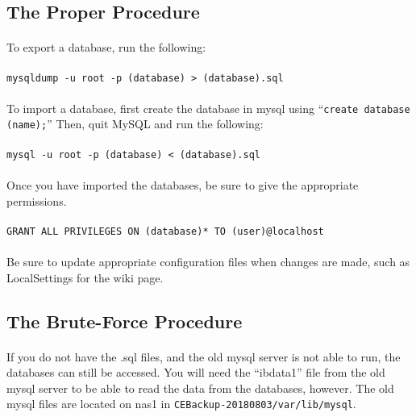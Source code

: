 \documentclass[12pt]{article}
\begin{document}
\subsection{The Proper Procedure}
\paragraph{} To export a database, run the following:
\paragraph{}{\tt mysqldump -u root -p (database) > (database).sql}
\paragraph{} To import a database, first create the database in mysql using ``{\tt create database (name);}'' Then, quit MySQL and run the following:
\paragraph{}{\tt mysql -u root -p (database) < (database).sql}    
\paragraph{} Once you have imported the databases, be sure to give the appropriate permissions.
\paragraph{} {\tt GRANT ALL PRIVILEGES ON (database)* TO (user)@localhost}
\paragraph{} Be sure to update appropriate configuration files when changes are made, such as LocalSettings for the wiki page. 

\subsection{The Brute-Force Procedure}
\paragraph{} If you do not have the .sql files, and the old mysql server is not able to run, the databases can still be accessed. You will need the ``ibdata1'' file from the old mysql server to be able to read the data from the databases, however. The old mysql files are located on nas1 in {\tt CEBackup-20180803/var/lib/mysql}. 
\end{document}
